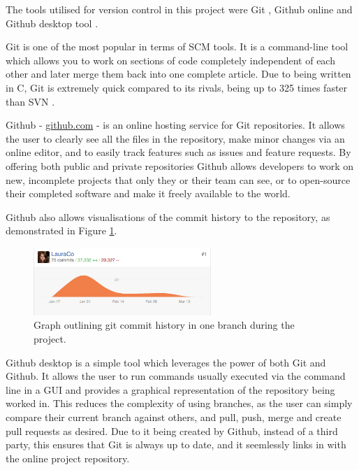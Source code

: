 The tools utilised for version control in this project were Git \cite{2014gits}, Github online \cite{github} and Github desktop tool \cite{github_desktop}.

Git \cite{2014gits} is one of the most popular in terms of \acrfull{SCM} tools. It is a command-line tool which allows you to work on sections of code completely independent of each other and later merge them back into one complete article. Due to being written in C, Git is extremely quick compared to its rivals, being up to 325 times faster than \acrfull{SVN} \cite{About_Git}.

Github \cite{github} - \url{github.com} - is an online hosting service for Git repositories. It allows the user to clearly see all the files in the repository, make minor changes via an online editor, and to easily track features such as issues and feature requests. By offering both public and private repositories Github allows developers to work on new, incomplete projects that only they or their team can see, or to open-source their completed software and make it freely available to the world.

Github also allows visualisations of the commit history to the repository, as demonstrated in Figure \ref{fig:git-graph}.

\begin{figure}[H]
  \centering
  \includegraphics[width=0.6\textwidth]{Chapter2/tools/git_graph.png}
  \caption{Graph outlining git commit history in one branch during the project.}
  \label{fig:git-graph}
\end{figure}

Github desktop \cite{github_desktop} is a simple tool which leverages the power of both Git and Github. It allows the user to run commands usually executed via the command line in a \acrshort{GUI} and provides a graphical representation of the repository being worked in. This reduces the complexity of using branches, as the user can simply compare their current branch against others, and pull, push, merge and create pull requests as desired. Due to it being created by Github, instead of a third party, this ensures that Git is always up to date, and it seemlessly links in with the online project repository.

